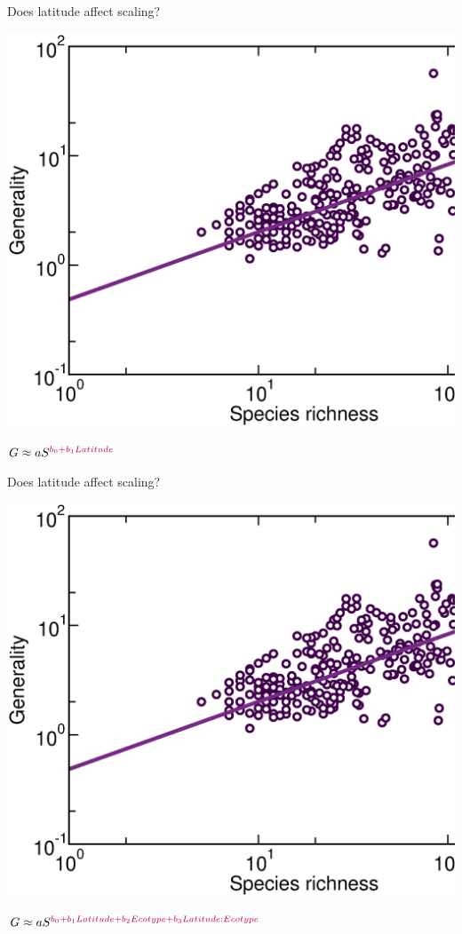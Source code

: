 \documentclass{beamer}
\begin{document}
  \begin{frame}{Does latitude affect scaling?}

    \begin{center}
      \includegraphics*[width=.654\textwidth]{Figures/results/Gen_dots_vs_S_fitline_observed.eps}

      \vspace{.3cm}
    \end{center}
      \hspace{.74cm}
      {\Large
      $G \approx aS^{\color{purple}b_0+b_1Latitude}$}
  \end{frame}


  \begin{frame}{Does latitude affect scaling?}
    \begin{center}
      \includegraphics*[width=.654\textwidth]{Figures/results/Gen_dots_vs_S_fitline_observed.eps}

      \vspace{.3cm}
    \end{center}
      \hspace{.74cm}
      {\Large
      $G \approx aS^{\color{purple}b_0+b_1Latitude+b_2Ecotype+b_3Latitude:Ecotype}$}

  \end{frame}
\end{document}
